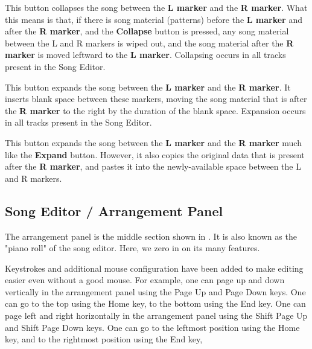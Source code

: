    This button collapses the song between the \textbf{L marker} and the
   \textbf{R marker}.
   What this means is that, if there is song material (patterns) before the
   \textbf{L marker} and after the \textbf{R marker},
   and the \textbf{Collapse} button is
   pressed, any song material between the L and R markers is wiped out, and
   the song material after the \textbf{R marker} is moved leftward to
   the \textbf{L marker}.
   Collapsing occurs in all tracks present in the Song Editor.

   This button expands the song between the
   \textbf{L marker} and the \textbf{R marker}.
   It inserts blank space between these markers, moving the song material
   that is after the \textbf{R marker}
   to the right by the duration of the blank space.
   Expansion occurs in all tracks present in the Song Editor.

   This button expands the song between the \textbf{L marker} and the
   \textbf{R marker} much like the \textbf{Expand} button.
   However, it also copies the original data that is present after the
   \textbf{R marker}, and pastes it into the newly-available space between
   the L and R markers.

\subsection{Song Editor / Arrangement Panel}
\label{subsec:seq64_song_editor_arrangement_panel}

   The arrangement panel is the middle section shown in
   .  It is also known as the
   "piano roll" of the song editor. Here, we zero in on its many
   features.

   Keystrokes and additional mouse configuration have been added to make
   editing easier even without a good mouse.
   For example, one can page up and down vertically in the arrangement
   panel using the
    Page Up and 
    Page Down keys.
   One can go to the top using the 
    Home key,
   to the bottom using the
    End key.
   One can page left and right horizontally in the arrangement
   panel using the
    Shift Page Up and 
    Shift Page Down keys.
   One can go to the leftmost position using the 
    Home key,
   and to the rightmost position using the
    End key,

